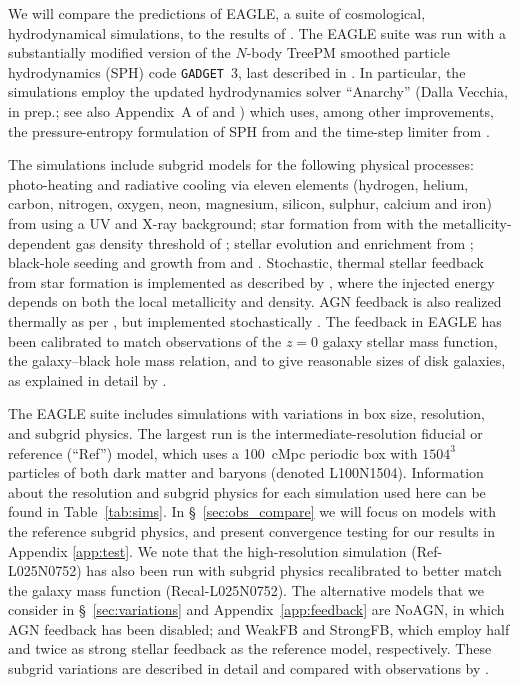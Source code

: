\documentclass[useAMS,usenatbib,letterpaper]{mn2e}
\def\obspaper{\citetalias{turner14}}
\begin{document}
We will compare the predictions of EAGLE,
a suite of cosmological, hydrodynamical simulations, 
to the results of \obspaper.
The EAGLE suite was run with a substantially modified version of the $N$-body TreePM 
smoothed particle hydrodynamics (SPH) code \texttt{GADGET}~3,
last described in \citet{springel05a}. In particular, the simulations employ the updated hydrodynamics solver
``Anarchy''  (Dalla Vecchia, in prep.; see also Appendix~A of \citealt{schaye15} and \citealt{schaller15}) which uses,
among other improvements, the pressure-entropy formulation
of SPH from \citet{hopkins13} and the time-step limiter from \citet{durier12}. 

The simulations include subgrid models for the following physical processes:
photo-heating and radiative cooling via eleven elements (hydrogen, helium, carbon, nitrogen, oxygen,
neon, magnesium, silicon, sulphur, calcium and iron) from \citet{wiersma09a} using a
\citet{haardt01} UV and X-ray background;
star formation from \citet{schaye08} with the metallicity-dependent 
gas density threshold of \citet{schaye04};
stellar evolution and enrichment from \citet{wiersma09b};
black-hole seeding and growth from \citet{springel05b, rosas13} and \citet{schaye15}.
Stochastic, thermal stellar feedback from star formation 
is implemented as described by \citet{dallavecchia12}, where the injected energy 
depends on both the local metallicity and density.
AGN feedback is also realized thermally as per \citet{booth09},
but implemented stochastically \citep{schaye15}.
 The feedback in EAGLE has been calibrated to match observations of the
$z=0$ galaxy stellar mass function, the galaxy--black hole mass relation,
and to give reasonable sizes of disk galaxies, as explained in detail by \citet{crain15}. 

The EAGLE suite includes simulations with variations in box size,
resolution, and subgrid physics. The largest run is the intermediate-resolution fiducial or reference (``Ref'') model, 
which uses a 100~cMpc periodic box with $1504^3$ particles of both dark matter and baryons
(denoted L100N1504). Information about the resolution and subgrid physics for each simulation 
used here can be found in Table~\ref{tab:sims}. In \S~\ref{sec:obs_compare}
we will focus on models with the reference subgrid physics, 
and present convergence testing for our results in Appendix \ref{app:test}.
We note that the high-resolution simulation (Ref-L025N0752) has also been run with 
subgrid physics recalibrated to better match the galaxy mass function (Recal-L025N0752). 
The alternative models that we consider in \S~\ref{sec:variations} and Appendix~\ref{app:feedback}
are NoAGN, in which AGN feedback has been disabled;
and WeakFB and StrongFB, which employ half and twice as strong stellar feedback as the reference
model, respectively. These subgrid variations are described in detail and compared with observations
by \citet{crain15}. 
\end{document}
